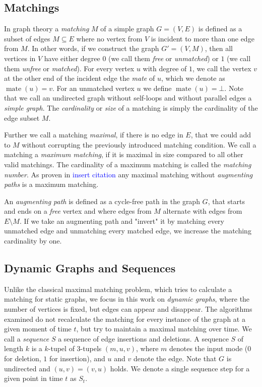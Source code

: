 \documentclass{article}      %
\newcommand\todo[1]{\textcolor{blue}{#1}}
\DeclareMathOperator\mate{mate}
\begin{document}

\subsection{Matchings}
\label{sec:matchings}

In graph theory a \emph{matching} $M$ of a simple graph $G=(V,E)$ is defined as a subset of edges $M \subseteq E$ where no vertex from $V$ is incident to more than one edge from $M$. In other words, if we construct the graph $G'=(V,M)$, then all vertices in $V$ have either degree $0$ (we call them \emph{free} or \emph{unmatched}) or $1$ (we call them \emph{unfree} or \emph{matched}). For every vertex $u$ with degree of $1$, we call the vertex $v$ at the other end of the incident edge the \emph{mate} of $u$, which we denote as $\mate(u)=v$. For an unmatched vertex $u$ we define $\mate(u)=\bot$. Note that we call an undirected graph without self-loops and without parallel edges a \emph{simple graph}. The \emph{cardinality} or \emph{size} of a matching is simply the cardinality of the edge subset $M$.

Further we call a matching \emph{maximal}, if there is no edge in $E$, that we could add to $M$ without corrupting the previously introduced matching condition. We call a matching a \emph{maximum matching}, if it is maximal in size compared to all other valid matchings. The cardinality of a maximum matching is called the \emph{matching number}. As proven in \todo{insert citation} any maximal matching without \emph{augmenting paths} is a maximum matching.

An \emph{augmenting path} is defined as a cycle-free path in the graph $G$, that starts and ends on a \emph{free} vertex and where edges from $M$ alternate with edges from $E \setminus M$. If we take an augmenting path and "invert" it by matching every unmatched edge and unmatching every matched edge, we increase the matching cardinality by one.

\subsection{Dynamic Graphs and Sequences}
\label{sec:dyn-graphs-seqs}

Unlike the classical maximal matching problem, which tries to calculate a matching for static graphs, we focus in this work on \emph{dynamic graphs}, where the number of vertices is fixed, but edges can appear and disappear. The algorithms examined do not recalculate the matching for every instance of the graph at a given moment of time $t$, but try to maintain a maximal matching over time. We call a \emph{sequence} $S$ a sequence of edge insertions and deletions. A sequence $S$ of length $k$ is a $k$-tupel of $3$-tupels $(m,u,v)$, where $m$ denotes the input mode ($0$ for deletion, $1$ for insertion), and $u$ and $v$ denote the edge. Note that $G$ is undirected and $(u,v)=(v,u)$ holds. We denote a single sequence step for a given point in time $t$ as $S_t$. 
\end{document}
